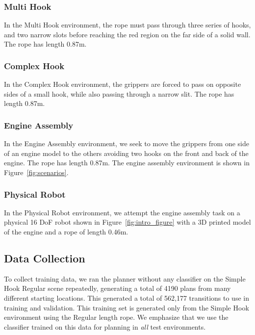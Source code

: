 \subsubsection{Multi Hook}
In the Multi Hook environment, the rope must pass through three series of hooks, and two narrow slots before reaching the red region on the far side of a solid wall. The rope has length 0.87m.

\subsubsection{Complex Hook}
In the Complex Hook environment, the grippers are forced to pass on opposite sides of a small hook, while also passing through a narrow slit. The rope has length 0.87m.

\subsubsection{Engine Assembly}
In the Engine Assembly environment, we seek to move the grippers from one side of an engine model \cite{EngineAssemblyTumber} to the others avoiding two hooks on the front and back of the engine. The rope has length 0.87m.
 The engine assembly environment is shown in Figure~\ref{fig:scenarios}.

\subsubsection{Physical Robot}
In the Physical Robot environment, we attempt the engine assembly task on a physical 16 DoF robot shown in Figure~\ref{fig:intro_figure} with a 3D printed model of the engine and a rope of length 0.46m.


\subsection{Data Collection}
\label{sec:ropedata}
To collect training data, we ran the planner without any classifier on the Simple Hook Regular scene repeatedly, generating a total of 4190 plans from many different starting locations. This generated a total of 562,177 transitions to use in training and validation. This training set is generated only from the Simple Hook environment using the Regular length rope. We emphasize that we use the classifier trained on this data for planning in \textit{all} test environments.


